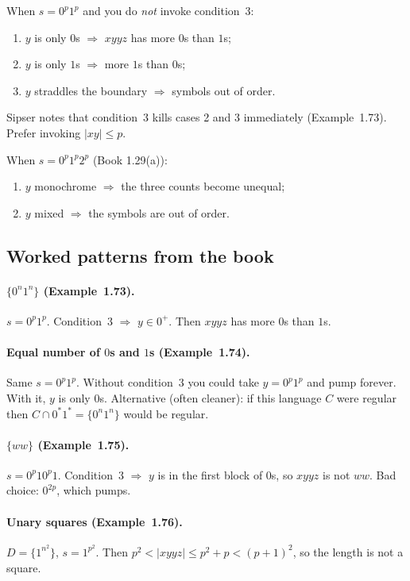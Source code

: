 \documentclass[11pt,a4paper]{article}
\begin{document}
When $s=0^p1^p$ and you do \emph{not} invoke condition~3:
\begin{enumerate}[nosep]
  \item $y$ is only $0$s $\Rightarrow$ $xyyz$ has more $0$s than $1$s;
  \item $y$ is only $1$s $\Rightarrow$ more $1$s than $0$s;
  \item $y$ straddles the boundary $\Rightarrow$ symbols out of order.
\end{enumerate}
Sipser notes that condition~3 kills cases 2 and 3 immediately
(Example~1.73). Prefer invoking $|xy|\le p$.

When $s=0^p1^p2^p$ (Book 1.29(a)):
\begin{enumerate}[nosep]
  \item $y$ monochrome $\Rightarrow$ the three counts become unequal;
  \item $y$ mixed $\Rightarrow$ the symbols are out of order.
\end{enumerate}

\subsection{Worked patterns from the book}

\paragraph{$\{0^n1^n\}$ (Example~1.73).}
$s=0^p1^p$. Condition~3 $\Rightarrow$ $y\in 0^+$. Then $xyyz$ has
more $0$s than $1$s.

\paragraph{Equal number of $0$s and $1$s (Example~1.74).}
Same $s=0^p1^p$. Without condition~3 you could take $y=0^p1^p$ and
pump forever. With it, $y$ is only $0$s. Alternative (often cleaner):
if this language $C$ were regular then
$C\cap 0^*1^*=\{0^n1^n\}$ would be regular.

\paragraph{$\{ww\}$ (Example~1.75).}
$s=0^p10^p1$. Condition~3 $\Rightarrow$ $y$ is in the first block of
$0$s, so $xyyz$ is not $ww$. Bad choice: $0^{2p}$, which pumps.

\paragraph{Unary squares (Example~1.76).}
$D=\{1^{n^2}\}$, $s=1^{p^2}$. Then
$p^2<|xyyz|\le p^2+p<(p+1)^2$, so the length is not a square.
\end{document}
